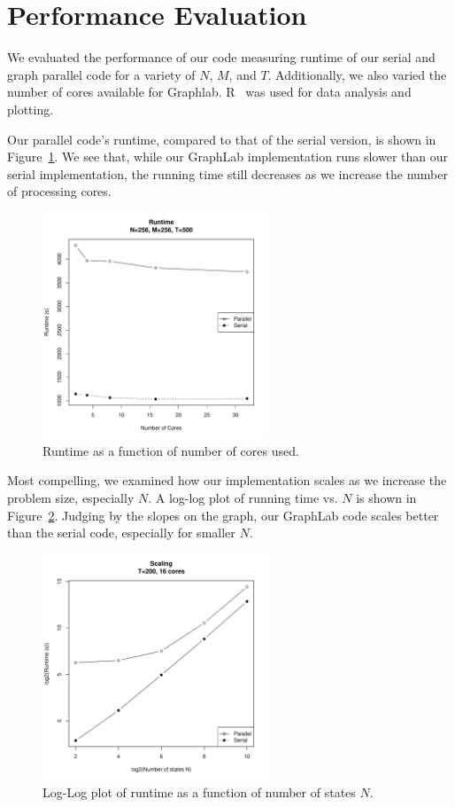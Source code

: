 \section{Performance Evaluation}

We evaluated the performance of our code measuring runtime of our serial and
graph parallel code for a variety of $N$, $M$, and $T$. Additionally, we also
varied the number of cores available for Graphlab. R~\cite{r} was used for data
analysis and plotting. 

Our parallel code's runtime, compared to that of the serial version, is shown in
Figure~\ref{fig:runtime-256-500}. We see that, while our GraphLab implementation
runs slower than our serial implementation, the running time still decreases as
we increase the number of processing cores. 

\begin{figure}[htb]
    \centering
    \includegraphics[width=0.6\textwidth]{../figure/runtime-N_256-T_500.pdf}
    \caption{Runtime as a function of number of cores used.}
    \label{fig:runtime-256-500}
\end{figure}

Most compelling, we examined how our implementation scales as we increase the
problem size, especially $N$. A log-log plot of running time vs. $N$ is shown in
Figure~\ref{fig:scaling-16-200}. Judging by the slopes on the graph, our
GraphLab code scales better than the serial code, especially for smaller $N$. 

\begin{figure}[htb]
    \centering
    \includegraphics[width=0.6\textwidth]{../figure/scaling-cores_16-T_200.pdf}
    \caption{Log-Log plot of runtime as a function of number of states $N$.}
    \label{fig:scaling-16-200}
\end{figure}
